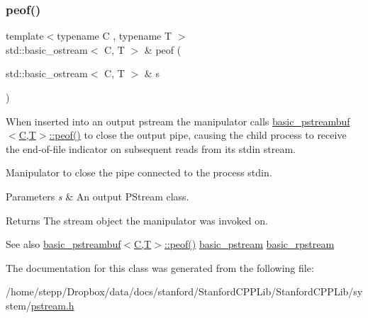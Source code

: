 \subsubsection{\texorpdfstring{peof()}{peof()}}
{\footnotesize\ttfamily template$<$typename C , typename T $>$ \\
std\+::basic\+\_\+ostream$<$ C, T $>$ \& peof (\begin{DoxyParamCaption}\item[{std\+::basic\+\_\+ostream$<$ C, T $>$ \&}]{s }\end{DoxyParamCaption})\hspace{0.3cm}{\ttfamily [related]}}



When inserted into an output pstream the manipulator calls \mbox{\hyperlink{classredi_1_1basic__pstreambuf_a6937e84719c4eaf08f2a2e514ff98e93}{basic\+\_\+pstreambuf$<$\+C,\+T$>$\+::peof()}} to close the output pipe, causing the child process to receive the end-\/of-\/file indicator on subsequent reads from its {\ttfamily stdin} stream. 

Manipulator to close the pipe connected to the process\textquotesingle{} stdin. 
\begin{DoxyParams}{Parameters}
{\em s} & An output P\+Stream class. \\
\hline
\end{DoxyParams}
\begin{DoxyReturn}{Returns}
The stream object the manipulator was invoked on. 
\end{DoxyReturn}
\begin{DoxySeeAlso}{See also}
\mbox{\hyperlink{classredi_1_1basic__pstreambuf_a6937e84719c4eaf08f2a2e514ff98e93}{basic\+\_\+pstreambuf$<$\+C,\+T$>$\+::peof()}} \mbox{\hyperlink{classredi_1_1basic__pstream}{basic\+\_\+pstream}} \mbox{\hyperlink{classredi_1_1basic__rpstream}{basic\+\_\+rpstream}} 
\end{DoxySeeAlso}


The documentation for this class was generated from the following file\+:\begin{DoxyCompactItemize}
\item 
/home/stepp/\+Dropbox/data/docs/stanford/\+Stanford\+C\+P\+P\+Lib/\+Stanford\+C\+P\+P\+Lib/system/\mbox{\hyperlink{pstream_8h}{pstream.\+h}}\end{DoxyCompactItemize}
